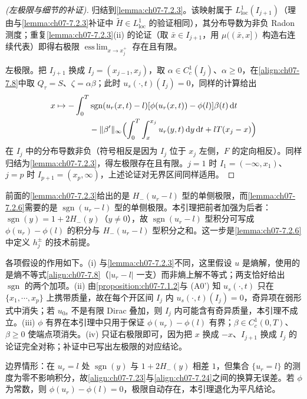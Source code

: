 \documentclass[../../main.tex]{subfiles}%
\begin{document}
\begin{proof}[(左极限与细节的补证)]
归结到\cref{lemma:ch07-7.2.3}。该映射属于 $L^1_{\mathrm{loc}}(I_{j+1})$（理由与\cref{lemma:ch07-7.2.3}补证中 $\widetilde H\in L^1_{\mathrm{loc}}$ 的验证相同），其分布导数为非负 Radon 测度；重复\cref{lemma:ch07-7.2.3}(ii) 的论证（取 $\bar x\in I_{j+1}$，用 $\mu((\bar x,x])$ 构造右连续代表）即得右极限 $\operatorname*{ess\,lim}_{x\to x_j^+}$ 存在且有限。

左极限。把 $I_{j+1}$ 换成 $I_j=(x_{j-1},x_j)$，取 $\alpha\in C^1_c(I_j)$、$\alpha\geqslant0$，在\eqref{align:ch07-7.8}中取 $Q_\tau=S$、$\zeta=\alpha\beta$；此时 $u_s(\cdot,t)(I_j)=0$，同样的计算给出
\begin{align*}
x\mapsto-\int_0^T&\operatorname{sgn}(u_r(x,t)-l)[\phi(u_r(x,t))-\phi(l)]\beta(t)\,\mathrm{d}t\\
&-\|\beta'\|_\infty\Bigl(\int_0^T\int_x^{x_j}u_r(y,t)\,\mathrm{d}y\,\mathrm{d}t+lT(x_j-x)\Bigr)
\end{align*}
在 $I_j$ 中的分布导数非负（符号相反是因为 $I_j$ 位于 $x_j$ 左侧，$F$ 的定向相反）。同样归结为\cref{lemma:ch07-7.2.3}，得左极限存在且有限。$j=1$ 时 $I_1=(-\infty,x_1)$、$j=p$ 时 $I_{p+1}=(x_p,\infty)$，上述论证对无界区间同样适用。
\end{proof}

\begin{remark}\label{remark:ch07-7.2.5动机}
前面的\cref{lemma:ch07-7.2.3}给出的是 $H_-(u_r-l)$ 型的单侧极限，而\cref{lemma:ch07-7.2.6}需要的是 $\operatorname{sgn}(u_r-l)$ 型的单侧极限。本引理把前者加强为后者：$\operatorname{sgn}(y)=1+2H_-(y)$（$y\neq0$），故 $\operatorname{sgn}(u_r-l)$ 型积分可写成 $\phi(u_r)-\phi(l)$ 的积分与 $H_-(u_r-l)$ 型积分之和。这一步是\cref{lemma:ch07-7.2.6}中定义 $h_j^\pm$ 的技术前提。

各项假设的作用如下。(i) 与\cref{lemma:ch07-7.2.3}不同，这里假设 $u$ 是熵解，使用的是熵不等式\eqref{align:ch07-7.8}（$|u_r-l|$ 一支）而非熵上解不等式；两支恰好给出 $\operatorname{sgn}$ 的两个加项。(ii) 由\cref{proposition:ch07-7.1.2}与 (A0') 知 $u_s(\cdot,t)$ 只在 $\{x_1,\cdots,x_p\}$ 上携带质量，故在每个开区间 $I_j$ 内 $u_s(\cdot,t)(I_j)=0$，奇异项在弱形式中消失；若 $u_{0s}$ 不是有限 Dirac 叠加，则 $I_j$ 内可能含有奇异质量，本引理不成立。(iii) $\phi$ 有界在本引理中只用于保证 $\phi(u_r)-\phi(l)$ 有界；$\beta\in C^1_c(0,T)$、$\beta\geqslant0$ 使端点项消失。(iv) 只证右极限即可，因为把 $x$ 换成 $-x$、$I_{j+1}$ 换成 $I_j$ 的论证完全对称；补证中已写出左极限的对应结论。

边界情形：在 $u_r=l$ 处 $\operatorname{sgn}(y)$ 与 $1+2H_-(y)$ 相差 $1$，但集合 $\{u_r=l\}$ 的测度为零不影响积分，故\eqref{align:ch07-7.23}与\eqref{align:ch07-7.24}之间的换算无误差。若 $\phi$ 为常数，则 $\phi(u_r)-\phi(l)=0$，极限自动存在，本引理退化为平凡结论。
\end{remark}
\end{document}
